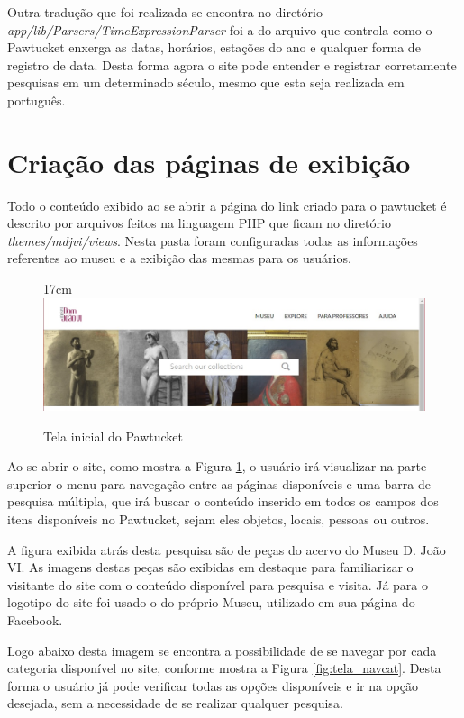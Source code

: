 \documentclass[a4paper,12pt,oneside,onecolumn,final,fleqn]{repUERJ}
\begin{document}
Outra tradução que foi realizada se encontra no diretório \textit{app/lib/Parsers/TimeExpressionParser} foi a do arquivo que controla como o Pawtucket enxerga as datas, horários, estações do ano e qualquer forma de registro de data. Desta forma agora o site pode entender e registrar corretamente pesquisas em um determinado século, mesmo que esta seja realizada em português.

\section{Criação das páginas de exibição}

Todo o conteúdo exibido ao se abrir a página do link criado para o pawtucket é descrito por arquivos feitos na linguagem PHP que ficam no diretório \textit{themes/mdjvi/views}. Nesta pasta foram configuradas todas as informações referentes ao museu e a exibição das mesmas para os usuários.

\begin{figure}[!ht]{17cm}
	\includegraphics[width=15cm, center]{figuras/pawtucket_telainicial.jpg}
	\caption{Tela inicial do Pawtucket} \label{fig:tela_inic}
\end{figure}

Ao se abrir o site, como mostra a Figura \ref{fig:tela_inic}, o usuário irá visualizar na parte superior o menu para navegação entre as páginas disponíveis e uma barra de pesquisa múltipla, que irá buscar o conteúdo inserido em todos os campos dos itens disponíveis no Pawtucket, sejam eles objetos, locais, pessoas ou outros.

A figura exibida atrás desta pesquisa são de peças do acervo do Museu D. João VI. As imagens destas peças são exibidas em destaque para familiarizar o visitante do site com o conteúdo disponível para pesquisa e visita. Já para o logotipo do site foi usado o do próprio Museu, utilizado em sua página do Facebook.

Logo abaixo desta imagem se encontra a possibilidade de se navegar por cada categoria disponível no site, conforme mostra a Figura \ref{fig:tela_navcat}. Desta forma o usuário já pode verificar todas as opções disponíveis e ir na opção desejada, sem a necessidade de se realizar qualquer pesquisa.
\end{document}
